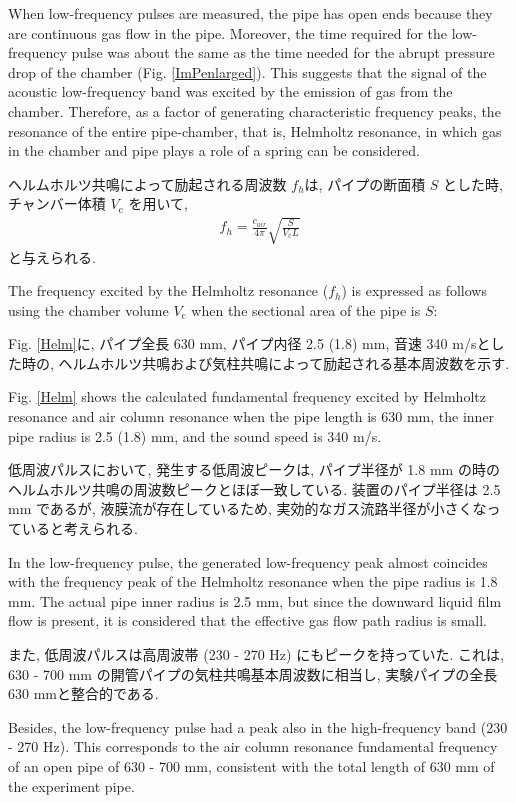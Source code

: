 \documentclass[12pt]{article}
\begin{document}
When low-frequency pulses are measured, the pipe has open ends because they are continuous gas flow in the pipe.
Moreover, the time required for the low-frequency pulse was about the same as the time needed for the abrupt pressure drop of the chamber (Fig. \ref{ImPenlarged}).
This suggests that the signal of the acoustic low-frequency band was excited by the emission of gas from the chamber.
Therefore, as a factor of generating characteristic frequency peaks, the resonance of the entire pipe-chamber, that is, Helmholtz resonance, in which gas in the chamber and pipe plays a role of a spring can be considered.

ヘルムホルツ共鳴によって励起される周波数 $f_h$は, パイプの断面積 $S$ とした時, チャンバー体積 $V_\mathrm{c}$ を用いて,  
\begin{eqnarray}
f_{h}=\frac{c_{air}}{4\pi} \sqrt{  \frac{S}{V_\mathrm{c} L }   } \label{Helmeq}
\end{eqnarray}
と与えられる. 

The frequency excited by the Helmholtz resonance ($f_h$) is expressed as follows using the chamber volume $V_\mathrm{c}$ when the sectional area of ​​the pipe is $S$:

Fig. \ref{Helm}に, パイプ全長 630 mm, パイプ内径 2.5 (1.8) mm, 音速 340 m/sとした時の, ヘルムホルツ共鳴および気柱共鳴によって励起される基本周波数を示す. 

Fig. \ref{Helm} shows the calculated fundamental frequency excited by Helmholtz resonance and air column resonance when the pipe length is 630 mm, the inner pipe radius is 2.5 (1.8) mm, and the sound speed is 340 m/s.

低周波パルスにおいて, 発生する低周波ピークは, パイプ半径が 1.8 mm の時のヘルムホルツ共鳴の周波数ピークとほぼ一致している. 
装置のパイプ半径は 2.5 mm であるが, 液膜流が存在しているため, 実効的なガス流路半径が小さくなっていると考えられる. 

In the low-frequency pulse, the generated low-frequency peak almost coincides with the frequency peak of the Helmholtz resonance when the pipe radius is 1.8 mm.
The actual pipe inner radius is 2.5 mm, but since the downward liquid film flow is present, it is considered that the effective gas flow path radius is small.

また, 低周波パルスは高周波帯 (230 - 270 Hz) にもピークを持っていた. 
これは, 630 - 700 mm の開管パイプの気柱共鳴基本周波数に相当し, 実験パイプの全長 630 mmと整合的である. 

Besides, the low-frequency pulse had a peak also in the high-frequency band (230 - 270 Hz).
This corresponds to the air column resonance fundamental frequency of an open pipe of 630 - 700 mm, consistent with the total length of 630 mm of the experiment pipe.
\end{document}

